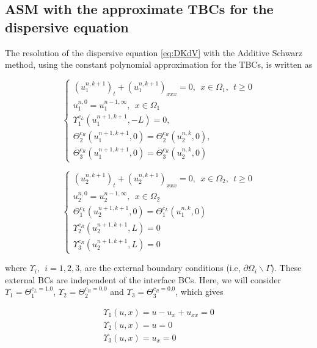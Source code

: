 \subsection{ASM with the approximate TBCs for the dispersive equation}

\indent The resolution of the dispersive equation \eqref{eq:DKdV} with the Additive Schwarz method, using the constant polynomial approximation for the TBCs, is written as

\begin{equation}
    \label{eq:problemDDM1}
    \begin{cases}
        (u_1^{n,k+1})_t + (u_1^{n,k+1})_{xxx} = 0 , \ \ x \in \Omega_1, \ \ t \geq 0\\
        u_1^{n,0} = u_1^{n-1,\infty} , \ \ x \in \Omega_1 \\
        \Upsilon_1^{c_L}(u_1^{n+1,k+1},-L) = 0, \\ 
        \Theta_2^{c_R}(u_1^{n+1,k+1},0) = \Theta_2^{c_R}(u_2^{n,k},0) , \\
        \Theta_3^{c_R}(u_1^{n+1,k+1},0) = \Theta_3^{c_R}(u_2^{n,k},0)
     \end{cases}
\end{equation}

\begin{equation}
    \label{eq:problemDDM2}
    \begin{cases}
        (u_2^{n,k+1})_t + (u_2^{n,k+1})_{xxx} = 0 , \ \ x \in \Omega_2, \ \ t \geq 0\\
        u_2^{n,0} = u_2^{n-1,\infty} , \ \ x \in \Omega_2 \\
        \Theta_1^{c_L}(u_2^{n+1,k+1},0) = \Theta_1^{c_L}(u_1^{n,k},0) \\
        \Upsilon_2^{c_R}(u_2^{n+1,k+1},L) = 0 \\
        \Upsilon_3^{c_R}(u_2^{n+1,k+1},L) = 0
     \end{cases}
\end{equation}

\noindent where $ \Upsilon_i, \ \ i=1,2,3$, are the external boundary conditions (i.e, $\partial \Omega_i \backslash \Gamma$). These external BCs are independent of the interface BCs. Here, we will consider $\Upsilon_1 = \Theta_1^{c_L = 1.0}$, $\Upsilon_2 = \Theta_2^{c_R = 0.0}$ and $\Upsilon_3 = \Theta_3^{c_R = 0.0}$, which gives

\begin{gather}
	\label{eq:externalBCsDDM}
	\Upsilon_1(u,x) = u - u_x + u_{xx} = 0\\
	\Upsilon_2(u,x) = u = 0\\
	\Upsilon_3(u,x) = u_x = 0\\
\end{gather}

